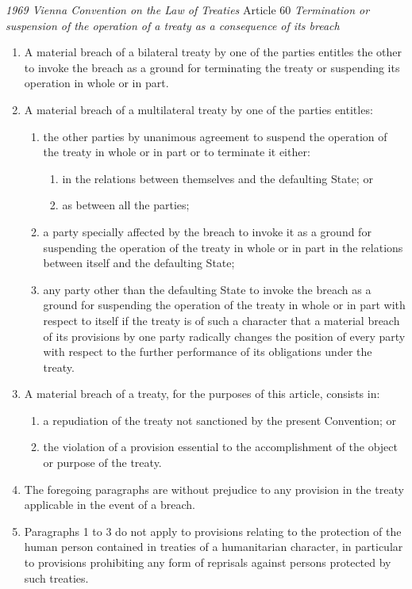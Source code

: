 \begin{conventiondetails}{\textit{1969 Vienna Convention on the Law of Treaties} Article 60}\label{VCLT Art 60}
    \flushleft
    \textit{Termination or suspension of the operation of a treaty as a consequence of its breach}

    \begin{enumerate}
        \item A material breach of a bilateral treaty by one of the parties entitles the other to invoke the breach as a ground for terminating the treaty or suspending its operation in whole or in part. 
        \item A material breach of a multilateral treaty by one of the parties entitles:
        \begin{enumerate}[label=(\alph*)]
            \item the other parties by unanimous agreement to suspend the operation of the treaty in whole or in part or to terminate it either:
            \begin{enumerate}[label=(\roman*)]
                \item in the relations between themselves and the defaulting State; or 
                \item as between all the parties;
            \end{enumerate}
            \item a party specially affected by the breach to invoke it as a ground for suspending the operation of the treaty in whole or in part in the relations between itself and the defaulting State; 
            \item any party other than the defaulting State to invoke the breach as a ground for suspending the operation of the treaty in whole or in part with respect to itself if the treaty is of such a character that a material breach of its provisions by one party radically changes the position of every party with respect to the further performance of its obligations under the treaty.
        \end{enumerate}
        \item A material breach of a treaty, for the purposes of this article, consists in:
        \begin{enumerate}[label=(\alph*)]
            \item a repudiation of the treaty not sanctioned by the present Convention; or 
            \item the violation of a provision essential to the accomplishment of the object or purpose of the treaty.
        \end{enumerate}
        \item The foregoing paragraphs are without prejudice to any provision in the treaty applicable in the event of a breach. 
        \item Paragraphs 1 to 3 do not apply to provisions relating to the protection of the human person contained in treaties of a humanitarian character, in particular to provisions prohibiting any form of reprisals against persons protected by such treaties. 
    \end{enumerate}
\end{conventiondetails}

